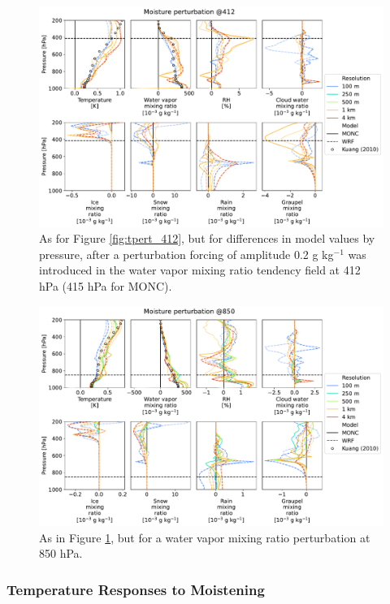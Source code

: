 \documentclass[draft]{agujournal2019}
\begin{document}
\begin{figure}[pth]
    \noindent\includegraphics[width=\textwidth]{figures/pert_diffs_q_0.0002_@412}
    \caption{As for Figure \ref{fig:tpert_412}, but for differences in model
    values by pressure, after a perturbation forcing of amplitude 0.2 g
    kg$^{-1}$ was introduced in the water vapor mixing ratio tendency field at
    412 hPa (415 hPa for MONC).}
    \label{fig:qpert_412}
\end{figure}

\begin{figure}[pth]
    \noindent\includegraphics[width=\textwidth]{figures/pert_diffs_q_0.0002_@850}
    \caption{As in Figure \ref{fig:qpert_412}, but for a water vapor mixing
    ratio perturbation at 850 hPa.}
    \label{fig:qpert_850}
\end{figure}

\subsubsection{Temperature Responses to Moistening}
\end{document}
